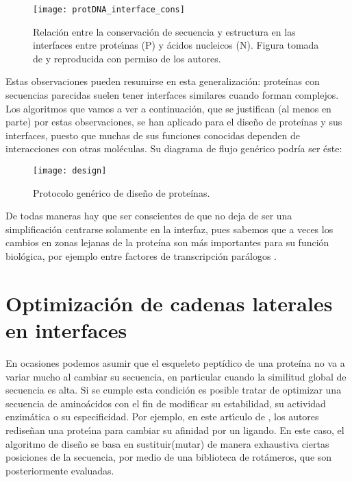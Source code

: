 \begin{figure}
\begin{center} 
\texttt{[image: protDNA\_interface\_cons]}
\caption%
{
Relaci\'{o}n entre la conservaci\'{o}n de secuencia y estructura en las interfaces entre 
prote\'\i{}nas (P) y \'{a}cidos nucleicos (N). Figura tomada de \citet{ContrerasMoreira2006}
y reproducida con permiso de los autores.
}
\label{fig:protdnacons}
\end{center}
\end{figure}

Estas observaciones pueden resumirse en esta generalizaci\'{o}n: 
prote\'{i}nas con secuencias parecidas suelen tener interfaces similares cuando forman complejos. 
Los algoritmos que vamos a ver a continuaci\'{o}n, que se justifican (al menos en parte)
por estas observaciones, se han aplicado para el dise\~no de prote\'{i}nas y sus interfaces,
puesto que muchas de sus funciones conocidas dependen de interacciones con otras mol\'{e}culas.
Su diagrama de flujo gen\'{e}rico podr\'{i}a ser \'{e}ste:

\begin{figure}
\begin{center} 
\texttt{[image: design]}
\caption%
{
Protocolo gen\'{e}rico de dise\~no de prote\'{i}nas.
}
\label{fig:design}
\end{center}
\end{figure}


De todas maneras hay que ser conscientes de que no deja de ser una simplificaci\'{o}n centrarse solamente en la interfaz, 
pues sabemos que a veces los cambios en zonas lejanas de la prote\'{i}na son m\'{a}s importantes para su funci\'{o}n biol\'{o}gica, 
por ejemplo entre factores de transcripci\'{o}n par\'{a}logos \citep{Hudson2016}.

\section{Optimizaci\'{o}n de cadenas laterales en interfaces} \label{scwrl}

En ocasiones podemos asumir que el esqueleto pept\'{i}dico de una prote\'{i}na %
no va a variar mucho al cambiar su secuencia, en particular cuando la similitud global de secuencia es alta.
Si se cumple esta condici\'{o}n es posible tratar de optimizar una secuencia de amino\'{a}cidos con
el fin de modificar su estabilidad, su actividad enzim\'{a}tica o su especificidad. Por ejemplo, 
en este art\'\i{}culo de \citet{Reina2002}, %
los autores redise\~nan una prote\'\i{}na para cambiar su afinidad por un ligando. En este caso, el algoritmo de 
dise\~no se basa en sustituir(mutar) de manera exhaustiva ciertas posiciones de la secuencia, por medio de
una biblioteca de rot\'{a}meros, que son posteriormente evaluadas.


